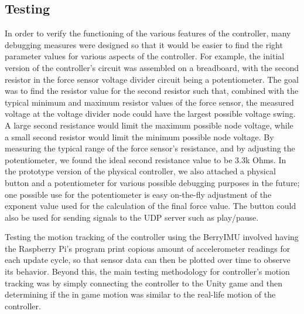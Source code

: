 \documentclass[titlepage, 12pt]{scrartcl}
\begin{document}
    \subsection{Testing}
        In order to verify the functioning of the various features of the controller, many debugging measures were designed so that it would be easier to find the right parameter values for various aspects of the controller. For example, the initial version of the controller's circuit was assembled on a breadboard, with the second resistor in the force sensor voltage divider circuit being a potentiometer. The goal was to find the resistor value for the second resistor such that, combined with the typical minimum and maximum resistor values of the force sensor, the measured voltage at the voltage divider node could have the largest possible voltage swing. A large second resistance would limit the maximum possible node voltage, while a small second resistor would limit the minimum possible node voltage. By measuring the typical range of the force sensor's resistance, and by adjusting the potentiometer, we found the ideal second resistance value to be 3.3k Ohms. In the prototype version of the physical controller, we also attached a physical button and a potentiometer for various possible debugging purposes in the future; one possible use for the potentiometer is easy on-the-fly adjustment of the exponent value used for the calculation of the final force value. The button could also be used for sending signals to the UDP server such as play/pause. \par
        Testing the motion tracking of the controller using the BerryIMU involved having the Raspberry Pi's program print copious amount of accelerometer readings for each update cycle, so that sensor data can then be plotted over time to observe its behavior. Beyond this, the main testing methodology for controller's motion tracking was by simply connecting the controller to the Unity game and then determining if the in game motion was similar to the real-life motion of the controller. \par
\end{document}
